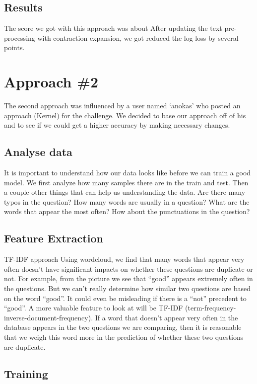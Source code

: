 \documentclass{article}
\begin{document}
\subsection{Results}

The score we got with this approach was about %
After updating the text pre-processing with contraction expansion,
we got reduced the log-loss by several points.

\section{Approach \#2}
The second approach was influenced by a user named ‘anokas’ who posted an approach (Kernel) for the challenge. We decided to base our approach off of his and to see if we could get a higher accuracy by making necessary changes.

\subsection{Analyse data}

It is important to understand how our data looks like before we can train a good model. We first analyze how many samples there are in the train and test. Then a couple other things that can help us understanding the data. Are there many typos in the question? How many words are usually in a question? What are the words that appear the most often? How about the punctuations in the question?

\subsection{Feature Extraction}

TF-IDF approach
Using wordcloud, we find that many words that appear very often doesn’t have significant impacts on whether these questions are duplicate or not. For example, from the picture we see that “good” appears extremely often in the questions. But we can’t really determine how similar two questions are based on the word “good”. It could even be misleading if there is a “not” precedent to “good”. 
A more valuable feature to look at will be TF-IDF (term-frequency-inverse-document-frequency). If a word that doesn’t appear very often in the database appears in the two questions we are comparing, then it is reasonable that we weigh this word more in the prediction of whether these two questions are duplicate. 

\subsection{Training}
\end{document}
